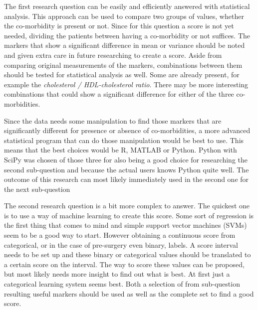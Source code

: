 \documentclass[10pt,a4paper]{article}
\begin{document}
	The first research question can be easily and efficiently answered with statistical analysis. This approach can be used to compare two groups of values, whether the co-morbidity is present or not. Since for this question a score is not yet needed, dividing the patients between having a co-morbidity or not suffices. The markers that show a significant difference in mean or variance should be noted and given extra care in future researching to create a score. Aside from comparing original measurements of the markers, combinations between them should be tested for statistical analysis as well. Some are already present, for example the \textit{cholesterol / HDL-cholesterol ratio}. There may be more interesting combinations that could show a significant difference for either of the three co-morbidities.
	
	Since the data needs some manipulation to find those markers that are significantly different for presence or absence of co-morbidities, a more advanced statistical program that can do those manipulation would be best to use. This means that the best choices would be R, MATLAB or Python. Python with SciPy was chosen of those three for also being a good choice for researching the second sub-question and because the actual users knows Python quite well. The outcome of this research can most likely immediately used in the second one for the next sub-question
	
	The second research question is a bit more complex to answer. The quickest one is to use a way of machine learning to create this score. Some sort of regression is the first thing that comes to mind and simple support vector machines (SVMs) seem to be a good way to start. However obtaining a continuous score from categorical, or in the case of pre-surgery even binary, labels. A score interval needs to be set up and these binary or categorical values should be translated to a certain score on the interval. The way to score these values can be proposed, but most likely needs more insight to find out what is best. At first just a categorical learning system seems best. Both a selection of from sub-question resulting useful markers should be used as well as the complete set to find a good score.
	
	
\end{document}
